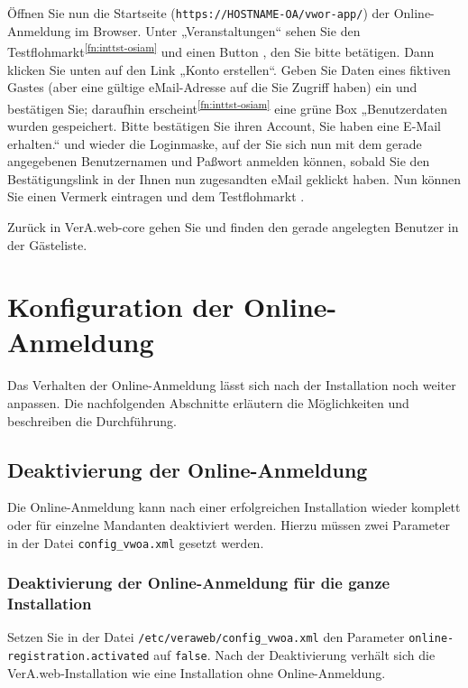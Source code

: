 \documentclass{tarentanleitung}
\begin{document}
Öffnen Sie nun die Startseite (\texttt{https://HOSTNAME-OA/vwor-app/})
der Online-Anmeldung im Browser. Unter „Veranstaltungen“ sehen Sie
den Testflohmarkt\Hair\textsuperscript{\ref{fn:inttst-osiam}} und
einen Button , den Sie bitte
betätigen. Dann klicken Sie unten auf den Link „Konto erstellen“.
Geben Sie Daten eines fiktiven Gastes (aber eine gültige eMail-Adresse
auf die Sie Zugriff haben) ein und bestätigen Sie; daraufhin
erscheint\Hair\textsuperscript{\ref{fn:inttst-osiam}} eine grüne Box
„Benutzerdaten wurden gespeichert. Bitte bestätigen Sie ihren Account,
Sie haben eine E-Mail erhalten.“ und wieder die Loginmaske, auf der
Sie sich nun mit dem gerade angegebenen Benutzernamen und Paßwort
anmelden können, sobald Sie den Bestätigungslink in der Ihnen nun
zugesandten eMail geklickt haben. Nun können Sie einen Vermerk eintragen
und dem Testflohmarkt .

Zurück in VerA.web-core gehen Sie 
und finden den gerade angelegten Benutzer in der Gästeliste.

\section{Konfiguration der Online-Anmeldung}\label{sec:conf-oa}

Das Verhalten der Online-Anmeldung lässt sich nach der Installation
noch weiter anpassen. Die nachfolgenden Abschnitte erläutern die
Möglichkeiten und beschreiben die Durchführung.

\subsection{Deaktivierung der Online-Anmeldung}\label{sec:deactivate-oa}

Die Online-Anmeldung kann nach einer erfolgreichen Installation
wieder komplett oder für einzelne Mandanten deaktiviert werden.
Hierzu müssen zwei Parameter in der Datei \texttt{config\_vwoa.xml}
gesetzt werden.

\subsubsection{Deaktivierung der Online-Anmeldung für die ganze Installation}

Setzen Sie in der Datei \texttt{/etc/veraweb/config\_vwoa.xml} den
Parameter \texttt{online-registration.activated} auf \texttt{false}.
Nach der Deaktivierung verhält sich die VerA.web-Installation wie eine
Installation ohne Online-Anmeldung.
\end{document}
